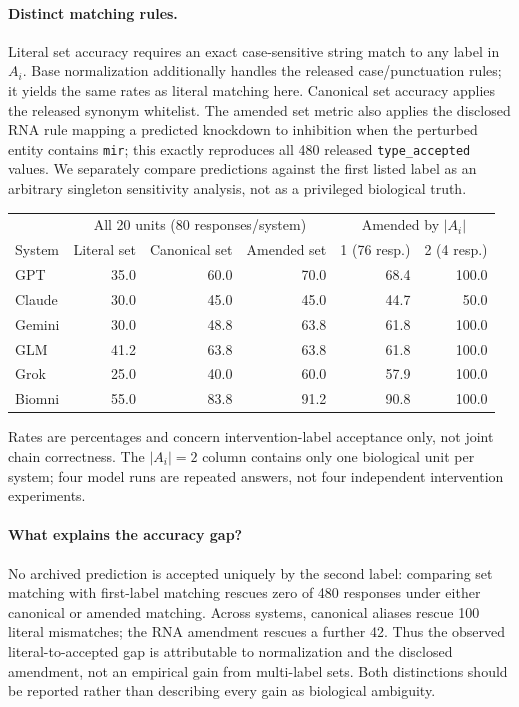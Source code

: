 \paragraph{Distinct matching rules.} Literal set accuracy requires an exact case-sensitive string match to any label in $A_i$. Base normalization additionally handles the released case/punctuation rules; it yields the same rates as literal matching here. Canonical set accuracy applies the released synonym whitelist. The amended set metric also applies the disclosed RNA rule mapping a predicted knockdown to inhibition when the perturbed entity contains \texttt{mir}; this exactly reproduces all 480 released \texttt{type\_accepted} values. We separately compare predictions against the first listed label as an arbitrary singleton sensitivity analysis, not as a privileged biological truth.
\begin{center}
\begin{tabular}{lrrrrr}
\toprule
 & \multicolumn{3}{c}{All 20 units (80 responses/system)} & \multicolumn{2}{c}{Amended by $|A_i|$} \\
System & Literal set & Canonical set & Amended set & 1 (76 resp.) & 2 (4 resp.) \\
\midrule
GPT & 35.0 & 60.0 & 70.0 & 68.4 & 100.0 \\
Claude & 30.0 & 45.0 & 45.0 & 44.7 & 50.0 \\
Gemini & 30.0 & 48.8 & 63.8 & 61.8 & 100.0 \\
GLM & 41.2 & 63.8 & 63.8 & 61.8 & 100.0 \\
Grok & 25.0 & 40.0 & 60.0 & 57.9 & 100.0 \\
Biomni & 55.0 & 83.8 & 91.2 & 90.8 & 100.0 \\
\bottomrule
\end{tabular}
\end{center}
Rates are percentages and concern intervention-label acceptance only, not joint chain correctness. The $|A_i|=2$ column contains only one biological unit per system; four model runs are repeated answers, not four independent intervention experiments.

\paragraph{What explains the accuracy gap?} No archived prediction is accepted uniquely by the second label: comparing set matching with first-label matching rescues zero of 480 responses under either canonical or amended matching. Across systems, canonical aliases rescue 100 literal mismatches; the RNA amendment rescues a further 42. Thus the observed literal-to-accepted gap is attributable to normalization and the disclosed amendment, not an empirical gain from multi-label sets. Both distinctions should be reported rather than describing every gain as biological ambiguity.

